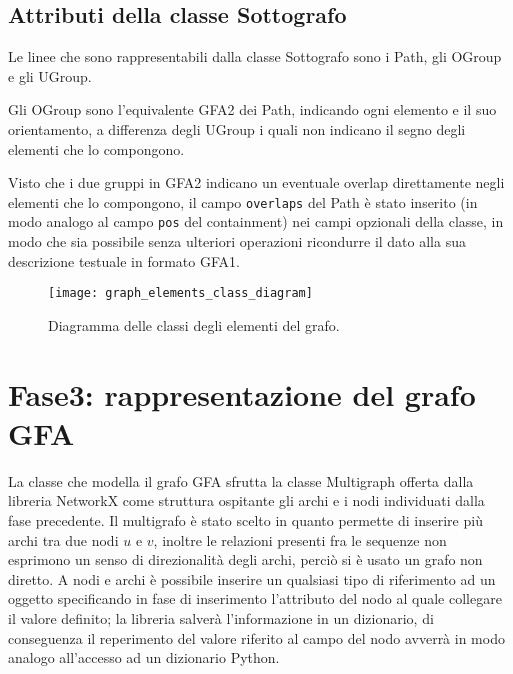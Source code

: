 \subsection{Attributi della classe Sottografo}
Le linee che sono rappresentabili dalla classe Sottografo sono i Path,
gli OGroup e gli UGroup.

Gli OGroup sono l'equivalente GFA2 dei Path, indicando ogni elemento
e il suo orientamento, a differenza degli UGroup i quali non indicano il
segno degli elementi che lo compongono.

Visto che i due gruppi in GFA2 indicano un eventuale overlap direttamente
negli elementi che lo compongono, il campo \texttt{overlaps} del Path
è stato inserito (in modo analogo al campo \texttt{pos} del containment)
nei campi opzionali della classe, in modo che sia possibile senza ulteriori operazioni
ricondurre il dato alla sua descrizione testuale in formato GFA1.

\noindent
\begin{figure}[t]
	\centering
	\texttt{[image: graph\_elements\_class\_diagram]}
	\caption[Diagramma delle classi degli elementi del grafo]{Diagramma delle classi degli elementi del grafo.}
\end{figure}
\clearpage

\section{Fase3: rappresentazione del grafo GFA}
La classe che modella il grafo GFA sfrutta la classe Multigraph offerta
dalla libreria NetworkX come struttura ospitante gli archi e i nodi individuati
dalla fase precedente. Il multigrafo è stato scelto in quanto permette
di inserire più archi tra due nodi $u$ e $v$, inoltre
le relazioni presenti fra le sequenze non esprimono un senso di direzionalità
degli archi, perciò si è usato un grafo non diretto.
A nodi e archi è possibile inserire un qualsiasi tipo di riferimento ad un oggetto specificando
in fase di inserimento l'attributo del nodo al quale collegare il valore definito; la libreria
salverà l'informazione in un dizionario, di conseguenza il reperimento del valore
riferito al campo del nodo avverrà in modo analogo all'accesso ad un dizionario Python.

